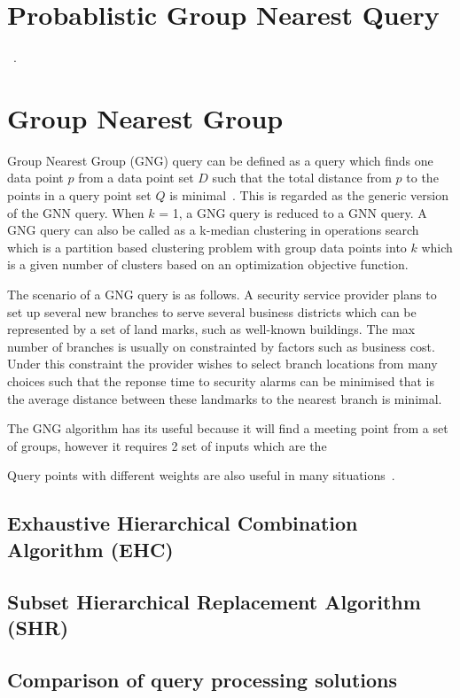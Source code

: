 \documentclass[a4paper,11pt]{article}
\begin{document}
\section{Probablistic Group Nearest Query}

~\cite{lian2008probabilistic}.

\section{Group Nearest Group}

Group Nearest Group (GNG) query can be defined as a query which finds one data point $p$ from a data point set $D$ such that the total distance from $p$ to the points in a query point set $Q$ is minimal~\cite{deng2012group}. This is regarded as the generic version of the GNN query. When $k$ = 1, a GNG query is reduced to a GNN query. A GNG query can also be called as a k-median clustering in operations search which is a partition based clustering problem with group data points into $k$ which is a given number of clusters based on an optimization objective function.

The scenario of a GNG query is as follows. A security service provider plans to set up several new branches to serve several business districts which can be represented by a set of land marks, such as well-known buildings. The max number of branches is usually on constrainted by factors such as business cost. Under this constraint the provider wishes to select branch locations from many choices such that the reponse time to security alarms can be minimised that is the average distance between these landmarks to the nearest branch is minimal.

The GNG algorithm has its useful because it will find a meeting point from a set of groups, however it requires 2 set of inputs which are the


Query points with different weights are also useful in many situations~\cite{deng2012group}.

\subsection{Exhaustive Hierarchical Combination Algorithm (EHC)}

\subsection{Subset Hierarchical Replacement Algorithm (SHR)}

\subsection{Comparison of query processing solutions}
\end{document}
